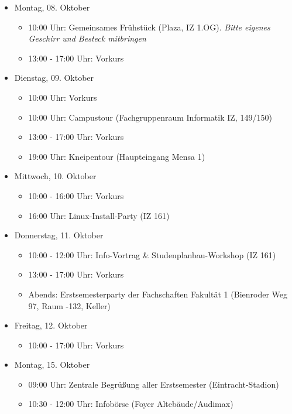 \begin{itemize}
    \item Montag, 08. Oktober
        \begin{itemize}
            \item 10:00 Uhr: Gemeinsames Frühstück (Plaza, IZ 1.OG). \emph{Bitte eigenes Geschirr und Besteck mitbringen}
            \item 13:00 - 17:00 Uhr: Vorkurs
        \end{itemize}
    \item Dienstag, 09. Oktober
        \begin{itemize}
            \item 10:00 Uhr: Vorkurs
            \item 10:00 Uhr: Campustour (Fachgruppenraum Informatik IZ, 149/150)
            \item 13:00 - 17:00 Uhr: Vorkurs
            \item 19:00 Uhr: Kneipentour (Haupteingang Mensa 1)
        \end{itemize}
    \item Mittwoch, 10. Oktober
        \begin{itemize}
            \item 10:00 - 16:00 Uhr: Vorkurs
            \item 16:00 Uhr: Linux-Install-Party (IZ 161)
        \end{itemize}
    \item Donnerstag, 11. Oktober
        \begin{itemize}
            \item 10:00 - 12:00 Uhr: Info-Vortrag \& Studenplanbau-Workshop (IZ 161)
            \item 13:00 - 17:00 Uhr: Vorkurs
            \item Abends: Erstsemesterparty der Fachschaften Fakultät 1 (Bienroder Weg 97, Raum -132, Keller)
        \end{itemize}
    \item Freitag, 12. Oktober
        \begin{itemize}
            \item 10:00 - 17:00 Uhr: Vorkurs
        \end{itemize}
    \item Montag, 15. Oktober
        \begin{itemize}
            \item 09:00 Uhr: Zentrale Begrüßung aller Erstsemester (Eintracht-Stadion)
            \item 10:30 - 12:00 Uhr: Infobörse  (Foyer Altebäude/Audimax)

\end{itemize}
\end{itemize}

